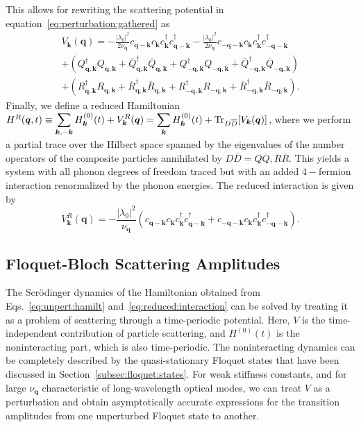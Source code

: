\documentclass[preprint,5p,times,twocolumn]{elsarticle}
\newcommand{\bmk}{\bm{k}}
\newcommand{\bmq}{\bm{q}}
\begin{document}
This allows for rewriting the scattering potential in equation~\ref{eq:perturbation:gathered} as
\begin{multline}
    V_{\bmk}(\bmq)= - \frac{|\lambda_0|^2}{2\nu_{\bmq}} c^{\;}_{\bmq-\bmk} c^{\;}_{\bmk} c^\dagger_{\bmk} c^\dagger_{\bmq-\bmk} -  \frac{|\lambda_0|^2}{2\nu_{\bmq}} c^{\;}_{-\bmq-\bmk} c^{\;}_{\bmk} c^\dagger_{\bmk} c^\dagger_{-\bmq-\bmk}  \\
    + \left( Q^\dagger_{\bmq,\bmk}Q_{\bmq,\bmk} + \overline{Q}^\dagger_{\bmq,\bmk}\overline{Q}_{\bmq, \bmk}+ Q^\dagger_{-\bmq,\bmk}Q_{-\bmq,\bmk}+ \overline{Q}^\dagger_{-\bmq,\bmk}\overline{Q}_{-\bmq,\bmk}\right)  \\ 
    + \left( R^\dagger_{\bmq, \bmk}R_{\bmq, \bmk} + \overline{R}^\dagger_{\bmq, \bmk}\overline{R}_{\bmq, \bmk}+ R^\dagger_{-\bmq, \bmk}R_{-\bmq, \bmk}+ \overline{R}^\dagger_{-\bmq, \bmk}\overline{R}_{-\bmq, \bmk}\right).
\end{multline}
Finally, we define a reduced Hamiltonian $H^R(\bmq, t)\equiv  \displaystyle\sum_{\bmk,-\bmk} H^{(0)}_{\bmk}(t) + V^R_{\bmk}(\bmq)=\displaystyle\sum_{\bmk} H^{(0)}_{\bmk}(t) + \Tr_{D\overline{D}}[V_{\bmk}(\bmq)]$, where we perform a partial trace over the Hilbert space spanned by the eigenvalues of the number operators of the composite particles annihilated by $D\overline{D}=Q\overline{Q},R\overline{R}$. This yields a system with all phonon degrees of freedom traced but with an added $4-$fermion interaction renormalized by the phonon energies. The reduced interaction is given by 
\begin{equation}
    V^R_{\bmk}(\bmq) = - \frac{|\lambda_0|^2}{\nu_{\bmq}}\left(c^{\;}_{\bmq-\bmk} c^{\;}_{\bmk} c^\dagger_{\bmk} c^\dagger_{\bmq-\bmk} + c^{\;}_{-\bmq-\bmk} c^{\;}_{\bmk} c^\dagger_{\bmk} c^\dagger_{-\bmq-\bmk}\right).
    \label{eq:reduced:interaction}
\end{equation}

\subsection{Floquet-Bloch Scattering Amplitudes}
\label{subsec:floquet:scattering}
The Scr\"odinger dynamics of the Hamiltonian obtained from Eqs.~\ref{eq:unpert:hamilt} and~\ref{eq:reduced:interaction} can be solved by treating it as a problem of scattering through a time-periodic potential. Here, $V$ is the time-independent contribution of particle scattering, and $H^{(0)}(t)$ is the noninteracting part, which is also time-periodic. The noninteracting dynamics can be completely described by the quasi-stationary Floquet states that have been discussed in Section~\ref{subsec:floquet:states}. For weak stiffness constants, and for large $\nu_{\bmq}$ characteristic of long-wavelength optical modes, we can treat $V$ as a perturbation and obtain asymptotically accurate expressions for the transition amplitudes from one unperturbed Floquet state to another.
\end{document}
